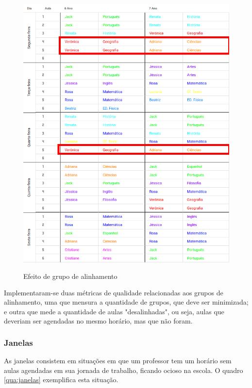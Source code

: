 \begin{figure}[!htb]
	\centering
	\caption{Efeito de grupo de alinhamento}
	\includegraphics[width=1\textwidth]{./dados/figuras/alinhados}
	\label{fig:alinhados}
\end{figure}
\pagebreak

Implementaram-se duas métricas de qualidade relacionadas aos grupos de alinhamento, uma que mensura a quantidade de grupos, que deve ser minimizada; e outra que mede a quantidade de aulas "desalinhadas", ou seja, aulas que deveriam ser agendadas no mesmo horário, mas que não foram.

\subsubsection{Janelas}

As janelas consistem em situações em que um professor tem um horário sem aulas agendadas em sua jornada de trabalho, ficando ocioso na escola. O quadro \ref{qua:janelas} exemplifica esta situação.

